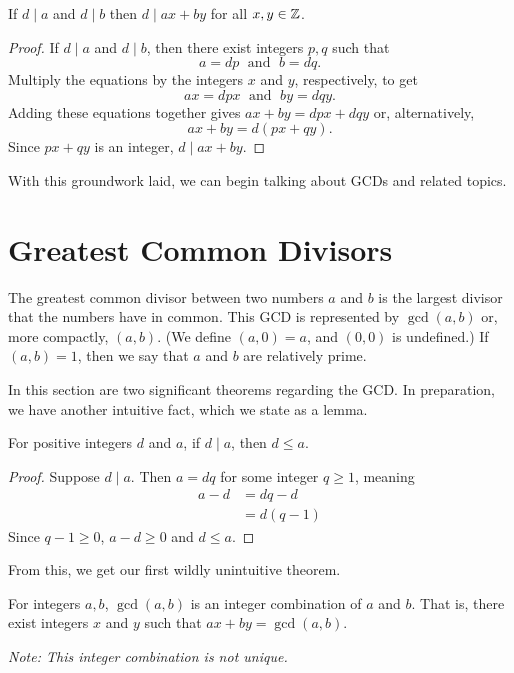 \documentclass[../m055main.tex]{subfiles}
\begin{document}
\begin{theorem}
    If $d \mid a$ and $d \mid b$ then $d \mid ax + by$ for all $x,y \in \mathbb{Z}$.
\end{theorem}

\begin{proof}
    If $d \mid a$ and $d \mid b$, then there exist integers $p,q$ such that
    \[ a = dp \;\text{ and }\; b = dq. \]
    Multiply the equations by the integers $x$ and $y$, respectively, to get
    \[ ax = dpx \;\text{ and }\; by = dqy. \]
    Adding these equations together gives $ax + by = dpx + dqy$ or, alternatively,
    \[ ax + by = d(px + qy). \]
    Since $px + qy$ is an integer, $d \mid ax + by$.
\end{proof}


With this groundwork laid, we can begin talking about GCDs and related topics.

\section{Greatest Common Divisors}
The greatest common divisor between two numbers $a$ and $b$ is the largest divisor that the numbers have in common.
This GCD is represented by $\gcd (a,b)$ or, more compactly, $(a,b)$.
(We define $(a,0) = a$, and $(0,0)$ is undefined.)
If $(a,b) = 1$, then we say that $a$ and $b$ are relatively prime.

In this section are two significant theorems regarding the GCD.
In preparation, we have another intuitive fact, which we state as a lemma.

\begin{lemma}
    For positive integers $d$ and $a$, if $d \mid a$, then $d \leq a$.
\end{lemma}

\begin{proof}
    Suppose $d \mid a$.
    Then $a = dq$ for some integer $q \geq 1$, meaning
    \begin{align*}
        a-d &= dq - d \\
        &= d (q-1)
    \end{align*}
    Since $q-1 \geq 0$, $a-d \geq 0$ and $d \leq a$.
\end{proof}

From this, we get our first wildly unintuitive theorem.

\begin{theorem}
    For integers $a,b$, $\gcd (a,b)$ is an integer combination of $a$ and $b$.
    That is, there exist integers $x$ and $y$ such that $ax + by = \gcd (a,b)$.

    \medskip
    \textit{Note: This integer combination is not unique.}
\end{theorem}
\end{document}
